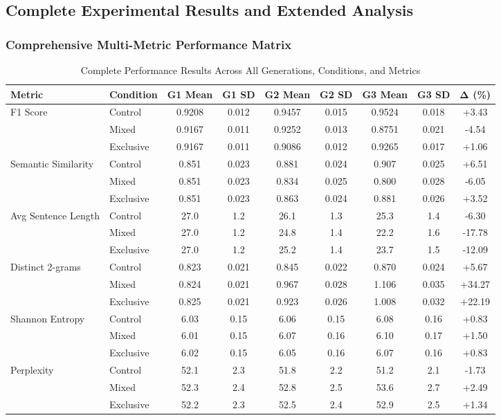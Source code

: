 \documentclass{article}
\begin{document}
\subsection{Complete Experimental Results and Extended Analysis}
\label{appendix:extended_results}

\subsubsection{Comprehensive Multi-Metric Performance Matrix}

\begin{table}[H]
\centering
\caption{Complete Performance Results Across All Generations, Conditions, and Metrics}
\label{tab:complete_performance_comprehensive}
\scriptsize
\begin{tabular}{llccccccc}
\toprule
\textbf{Metric} & \textbf{Condition} & \textbf{G1 Mean} & \textbf{G1 SD} & \textbf{G2 Mean} & \textbf{G2 SD} & \textbf{G3 Mean} & \textbf{G3 SD} & \textbf{Δ (\%)} \\
\midrule
\multirow{3}{*}{F1 Score} 
& Control & 0.9208 & 0.012 & 0.9457 & 0.015 & 0.9524 & 0.018 & +3.43 \\
& Mixed & 0.9167 & 0.011 & 0.9252 & 0.013 & 0.8751 & 0.021 & -4.54 \\
& Exclusive & 0.9167 & 0.011 & 0.9086 & 0.012 & 0.9265 & 0.017 & +1.06 \\
\midrule
\multirow{3}{*}{Semantic Similarity} 
& Control & 0.851 & 0.023 & 0.881 & 0.024 & 0.907 & 0.025 & +6.51 \\
& Mixed & 0.851 & 0.023 & 0.834 & 0.025 & 0.800 & 0.028 & -6.05 \\
& Exclusive & 0.851 & 0.023 & 0.863 & 0.024 & 0.881 & 0.026 & +3.52 \\
\midrule
\multirow{3}{*}{Avg Sentence Length} 
& Control & 27.0 & 1.2 & 26.1 & 1.3 & 25.3 & 1.4 & -6.30 \\
& Mixed & 27.0 & 1.2 & 24.8 & 1.4 & 22.2 & 1.6 & -17.78 \\
& Exclusive & 27.0 & 1.2 & 25.2 & 1.4 & 23.7 & 1.5 & -12.09 \\
\midrule
\multirow{3}{*}{Distinct 2-grams} 
& Control & 0.823 & 0.021 & 0.845 & 0.022 & 0.870 & 0.024 & +5.67 \\
& Mixed & 0.824 & 0.021 & 0.967 & 0.028 & 1.106 & 0.035 & +34.27 \\
& Exclusive & 0.825 & 0.021 & 0.923 & 0.026 & 1.008 & 0.032 & +22.19 \\
\midrule
\multirow{3}{*}{Shannon Entropy} 
& Control & 6.03 & 0.15 & 6.06 & 0.15 & 6.08 & 0.16 & +0.83 \\
& Mixed & 6.01 & 0.15 & 6.07 & 0.16 & 6.10 & 0.17 & +1.50 \\
& Exclusive & 6.02 & 0.15 & 6.05 & 0.16 & 6.07 & 0.16 & +0.83 \\
\midrule
\multirow{3}{*}{Perplexity} 
& Control & 52.1 & 2.3 & 51.8 & 2.2 & 51.2 & 2.1 & -1.73 \\
& Mixed & 52.3 & 2.4 & 52.8 & 2.5 & 53.6 & 2.7 & +2.49 \\
& Exclusive & 52.2 & 2.3 & 52.5 & 2.4 & 52.9 & 2.5 & +1.34 \\
\bottomrule
\end{tabular}
\end{table}
\end{document}
